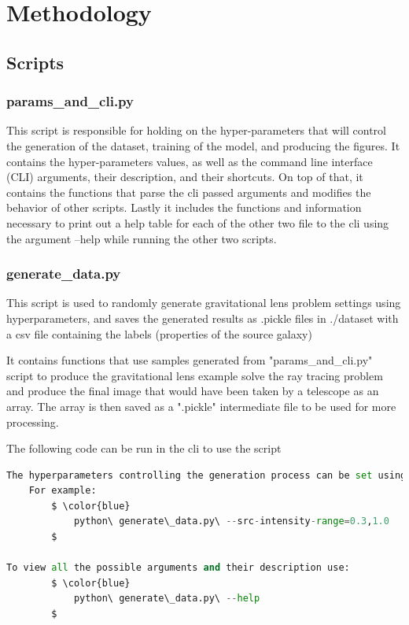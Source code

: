 \documentclass[12pt]{article}
\begin{document}
\section{Methodology}
\subsection{Scripts}
\subsubsection{params\_and\_cli.py}
This script is responsible for holding on the hyper-parameters that will control the generation of the dataset, training of the model, and producing the figures.
\newline\newline
It contains the hyper-parameters values, as well as the command line interface (CLI) arguments, their description, and their shortcuts. On top of that, it contains the functions that parse the cli passed arguments and modifies the behavior of other scripts. Lastly it includes the functions and information necessary to print out a help table for each of the other two file to the cli using the argument --help while running the other two scripts.

\subsubsection{generate\_data.py}
This script is used to randomly generate gravitational lens problem settings using hyperparameters, and saves the generated results as .pickle files in ./dataset with a csv file containing the labels (properties of the source
galaxy)

It contains functions that use samples generated from "params\_and\_cli.py" script to produce the gravitational lens example solve the ray tracing problem and produce the final image that would have been taken by a telescope as an array. The array is then saved as a ".pickle" intermediate file to be used for more processing.

The following code can be run in the cli to use the script

\begin{lstlisting}[mathescape=true, language=python]
The hyperparameters controlling the generation process can be set using the cli arguments while running the script.
    For example:
        $ \color{blue}
            python\ generate\_data.py\ --src-intensity-range=0.3,1.0
        $
        
To view all the possible arguments and their description use:
        $ \color{blue}
            python\ generate\_data.py\ --help
		$
\end{lstlisting}
\end{document}
